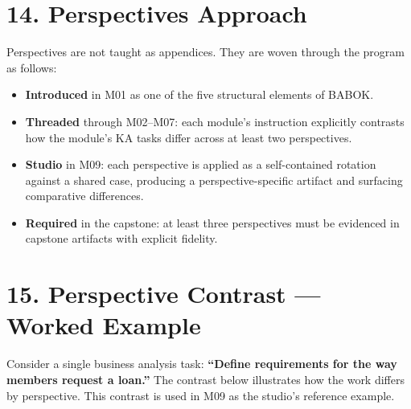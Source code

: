 \documentclass[11pt,letterpaper,oneside]{report}
\begin{document}

\section*{14. Perspectives Approach}
Perspectives are not taught as appendices. They are woven through the program as follows:

\begin{itemize}
  \item \textbf{Introduced} in M01 as one of the five structural elements of BABOK.
  \item \textbf{Threaded} through M02--M07: each module's instruction explicitly contrasts how the module's KA tasks differ across at least two perspectives.
  \item \textbf{Studio} in M09: each perspective is applied as a self-contained rotation against a shared case, producing a perspective-specific artifact and surfacing comparative differences.
  \item \textbf{Required} in the capstone: at least three perspectives must be evidenced in capstone artifacts with explicit fidelity.
\end{itemize}

\section*{15. Perspective Contrast --- Worked Example}
Consider a single business analysis task: \textbf{``Define requirements for the way members request a loan.''} The contrast below illustrates how the work differs by perspective. This contrast is used in M09 as the studio's reference example.
\end{document}
